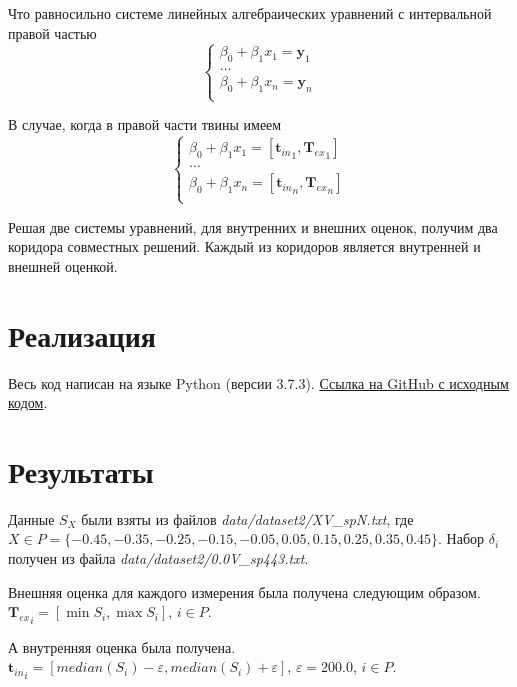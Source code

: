 \documentclass[a4paper,12pt]{article}
\begin{document}
    Что равносильно системе линейных алгебраических уравнений с интервальной правой частью
    \begin{equation}
        \begin{cases}
            \beta_0 + \beta_1 x_1 = \textbf{y}_1 \\
            \dots \\
            \beta_0 + \beta_1 x_n = \textbf{y}_n \\
        \end{cases}
    \end{equation}

    В случае, когда в правой части твины имеем
    \begin{equation}
        \begin{cases}
            \beta_0 + \beta_1 x_1 = [{\textbf{t}_{in}}_1, {\textbf{T}_{ex}}_1] \\
            \dots \\
            \beta_0 + \beta_1 x_n = [{\textbf{t}_{in}}_n, {\textbf{T}_{ex}}_n] \\
        \end{cases}
    \end{equation}

    Решая две системы уравнений, для внутренних и внешних оценок, получим два коридора совместных решений.
    Каждый из коридоров является внутренней и внешней оценкой.

    \section{Реализация}
    \quad Весь код написан на языке Python (версии 3.7.3).
    \href{https://github.com/kirillkuks/Intervals/tree/master/course}{Ссылка на GitHub с исходным кодом}.

    \section{Результаты}
    \quad Данные $ S_X $ были взяты из файлов \textsl{data/dataset2/XV\_spN.txt}, \newline
    где $ X \in P = \{-0.45, -0.35, -0.25, -0.15, -0.05, 0.05, 0.15, 0.25, 0.35, 0.45 \} $.
    Набор $ \delta_i $ получен из файла \textsl{data/dataset2/0.0V\_sp443.txt}.

    Внешняя оценка для каждого измерения была получена следующим образом.
    $ {\textbf{T}_{ex}}_i = [\min{S_i}, \max{S_i}] $, $ i \in P $.

    А внутренняя оценка была получена.
    $ {\textbf{t}_{in}}_i = [median(S_i) - \varepsilon, median(S_i) + \varepsilon] $, $ \varepsilon = 200.0 $, $ i \in P $.
\end{document}
